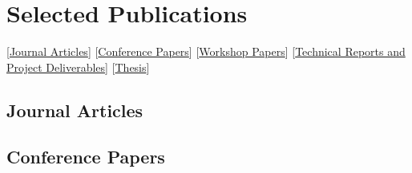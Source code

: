 \documentclass{article}
\begin{document}
\section*{Selected Publications}

[\hyperref[article]{Journal Articles}]
[\hyperref[conference]{Conference Papers}]
[\hyperref[workshop]{Workshop Papers}]
[\hyperref[report]{Technical Reports and Project Deliverables}]
[\hyperref[thesis]{Thesis}]


\subsection*{Journal Articles}
\label{article}

{\sloppy  %
\printbibliography[heading=customeheader,type=article,resetnumbers,notkeyword={underreview}]
}

\subsection*{Conference Papers}
\label{conference}

{\sloppy  %
\printbibliography[heading=customeheader,type=inproceedings,resetnumbers,
notkeyword={workshop}]
}

\end{document}
